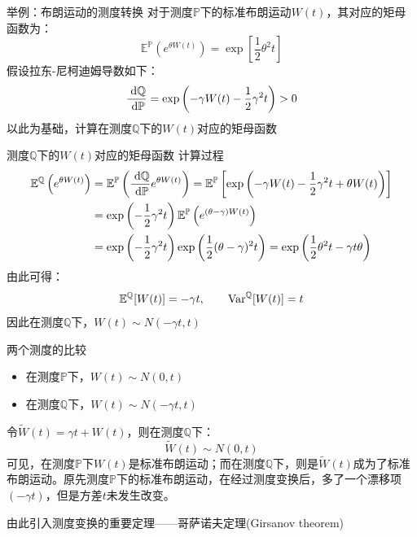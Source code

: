 \documentclass[t]{beamer}
\newcommand{\dif}{{\;\rm d}}
\newcommand{\E}{\mathbb{E}}
\newcommand{\Var}{{\rm Var}}
\begin{document}
\begin{frame}{举例：布朗运动的测度转换}
对于测度$\mathbb{P}$下的标准布朗运动$W(t)$，其对应的矩母函数为：
\begin{equation*}
\E^{\mathbb{P}} \left(e^{\theta W(t)} \right)=\exp\left[\frac{1}{2}\theta^2 t\right] 
\end{equation*}
假设拉东-尼柯迪姆导数如下：
\[\frac{\dif \mathbb{Q}}{\dif \mathbb{P}}=\exp\left( {-\gamma W(t)-\frac{1}{2}\gamma^{2} t }\right) >0 \]
以此为基础，计算在测度$\mathbb{Q}$下的$W(t)$对应的矩母函数
\end{frame}

\begin{frame}{测度$\mathbb{Q}$下的$W(t)$对应的矩母函数}
计算过程
\begin{equation*}
\begin{split}
\E^{\mathbb{Q}} \left(e^{\theta W(t)} \right)&=\E^{\mathbb{P}} \left(\frac{\dif\mathbb{Q}}{\dif \mathbb{P}}e^{\theta W(t)} \right)=\E^{\mathbb{P}}\left[\exp\left(  {-\gamma W(t)-\frac{1}{2}\gamma^{2} t }+\theta W(t)\right)  \right]\\
&=\exp\left(-\frac{1}{2}\gamma^{2} t \right) \E^{\mathbb{P}}\left(e^{(\theta-\gamma)W(t)}\right) \\
&=\exp\left(-\frac{1}{2}\gamma^{2} t \right)\exp\left(\frac{1}{2}(\theta-\gamma)^{2} t \right) =\exp\left(\frac{1}{2}\theta^{2} t-\gamma t\theta \right) 
\end{split}
\end{equation*}
由此可得：
\[\E^{\mathbb{Q}} [W(t)]=-\gamma t,\qquad \Var^{\mathbb{Q}} [W(t)] =t\]
因此在测度$\mathbb{Q}$下，$W(t)\sim N(-\gamma t,t)$
\end{frame}

\begin{frame}{两个测度的比较}
\begin{itemize}
\item 在测度$\mathbb{P}$下，$W(t)\sim N(0,t)$
\item
在测度$\mathbb{Q}$下，$W(t)\sim N(-\gamma t,t)$
\end{itemize}

令$\widetilde{W}(t)=\gamma t+W(t)$，则在测度$\mathbb{Q}$下：
\[\widetilde{W}(t)\sim N(0,t) \]
可见，在测度$\mathbb{P}$下$W(t)$是标准布朗运动；而在测度$\mathbb{Q}$下，则是$\widetilde{W}(t)$成为了标准布朗运动。原先测度$\mathbb{P}$下的标准布朗运动，在经过测度变换后，多了一个漂移项$(-\gamma t)$，但是方差$t$未发生改变。

{\color{blue}由此引入测度变换的重要定理——哥萨诺夫定理(Girsanov theorem)}
\end{frame}
\end{document}
